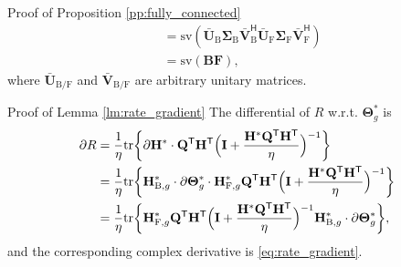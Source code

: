\documentclass[journal]{IEEEtran}
\begin{document}
\begin{appendix}
\begin{subsection}{Proof of Proposition \ref{pp:fully_connected}}
\begin{align*}
			                        & = \mathrm{sv}(\bar{\mathbf{U}}_\mathrm{B} \mathbf{\Sigma}_\mathrm{B} \mathbf{\bar{V}}_\mathrm{B}^\mathsf{H} \bar{\mathbf{U}}_\mathrm{F} \mathbf{\Sigma}_\mathrm{F} \mathbf{\bar{V}}_\mathrm{F}^\mathsf{H}) \\
			                        & = \mathrm{sv}(\mathbf{BF}),
		\end{align*}
		where $\bar{\mathbf{U}}_{\mathrm{B}/\mathrm{F}}$ and $\bar{\mathbf{V}}_{\mathrm{B}/\mathrm{F}}$ are arbitrary unitary matrices.
	\end{subsection}

	\begin{subsection}{Proof of Lemma \ref{lm:rate_gradient}}\label{ap:rate_gradient}
		The differential of $R$ w.r.t. $\mathbf{\Theta}_g^*$ is \cite{Hjorungnes2007}
		\begin{align*}
			\partial R
			 & = \frac{1}{\eta} \mathrm{tr} \biggl\{ \partial \mathbf{H}^* \cdot \mathbf{Q}^\mathsf{T} \mathbf{H}^\mathsf{T} \Bigl(\mathbf{I} + \frac{\mathbf{H}^* \mathbf{Q}^\mathsf{T} \mathbf{H}^\mathsf{T}}{\eta}\Bigr)^{-1} \biggr\}                                                                      \\
			 & = \frac{1}{\eta} \mathrm{tr} \biggl\{ \mathbf{H}_{\mathrm{B},g}^* \cdot \partial \mathbf{\Theta}_g^* \cdot \mathbf{H}_{\mathrm{F},g}^* \mathbf{Q}^\mathsf{T} \mathbf{H}^\mathsf{T} \Bigl(\mathbf{I} + \frac{\mathbf{H}^* \mathbf{Q}^\mathsf{T} \mathbf{H}^\mathsf{T}}{\eta}\Bigr)^{-1} \biggr\} \\
			 & = \frac{1}{\eta} \mathrm{tr} \biggl\{ \mathbf{H}_{\mathrm{F},g}^* \mathbf{Q}^\mathsf{T} \mathbf{H}^\mathsf{T} \Bigl(\mathbf{I} + \frac{\mathbf{H}^* \mathbf{Q}^\mathsf{T} \mathbf{H}^\mathsf{T}}{\eta}\Bigr)^{-1} \mathbf{H}_{\mathrm{B},g}^* \cdot \partial \mathbf{\Theta}_g^* \biggr\},
		\end{align*}
		and the corresponding complex derivative is \eqref{eq:rate_gradient}.
	\end{subsection}


\end{appendix}
\end{document}
